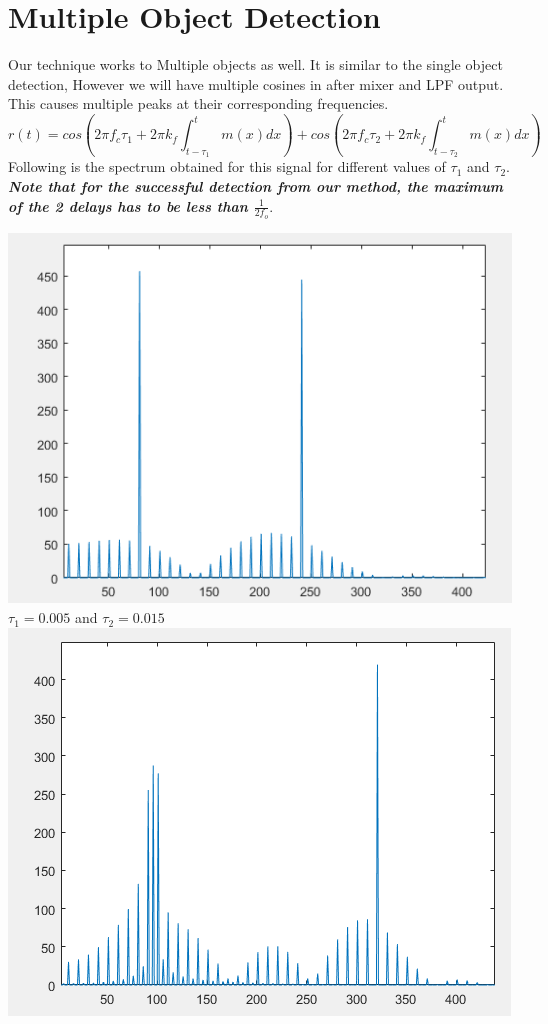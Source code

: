 \documentclass[12pt]{article}
\begin{document}
\section*{Multiple Object Detection}
\begin{flushleft}
Our technique works to Multiple objects as well. It is similar to the single object detection, However we will have multiple cosines in after mixer and LPF output. This causes multiple peaks at their corresponding frequencies.\\
\[r(t) = cos(2\pi f_c\tau_1+2\pi k_f \int_{t- \tau_1}^{t} m(x) dx )+ cos(2\pi f_c\tau_2+2\pi k_f \int_{t- \tau_2}^{t} m(x) dx )\]
Following is the spectrum obtained for this signal for different values of $\tau_1$ and $\tau_2$. \textbf{\textit{Note that for the successful detection from our method, the maximum of the 2 delays has to be less than $\frac{1}{2f_o}$}}.
\begin{center}
    \includegraphics[scale = 0.60]{a.PNG}\\[1.0 cm]
    $\tau_1= 0.005$ and $\tau_2=0.015$\\
    \includegraphics[scale = 0.6]{b.PNG}\\[1.0 cm]

\end{center}
\end{flushleft}
\end{document}
